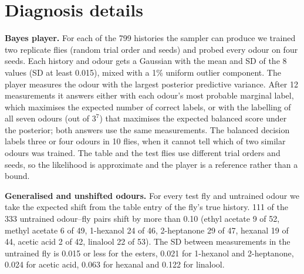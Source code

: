 \section{Diagnosis details}\label{app:diagnose}
\textbf{Bayes player.} For each of the 799 histories the sampler can produce we trained two replicate flies (random trial order and seeds) and probed every odour on four seeds. Each history and odour gets a Gaussian with the mean and SD of the 8 values (SD at least 0.015), mixed with a 1\% uniform outlier component. The player measures the odour with the largest posterior predictive variance. After 12 measurements it answers either with each odour's most probable marginal label, which maximises the expected number of correct labels, or with the labelling of all seven odours (out of $3^7$) that maximises the expected balanced score under the posterior; both answers use the same measurements. The balanced decision labels three or four odours in 10 flies, when it cannot tell which of two similar odours was trained. The table and the test flies use different trial orders and seeds, so the likelihood is approximate and the player is a reference rather than a bound.

\textbf{Generalised and unshifted odours.} For every test fly and untrained odour we take the expected shift from the table entry of the fly's true history. 111 of the 333 untrained odour--fly pairs shift by more than 0.10 (ethyl acetate 9 of 52, methyl acetate 6 of 49, 1-hexanol 24 of 46, 2-heptanone 29 of 47, hexanal 19 of 44, acetic acid 2 of 42, linalool 22 of 53). The SD between measurements in the untrained fly is 0.015 or less for the esters, 0.021 for 1-hexanol and 2-heptanone, 0.024 for acetic acid, 0.063 for hexanal and 0.122 for linalool.

